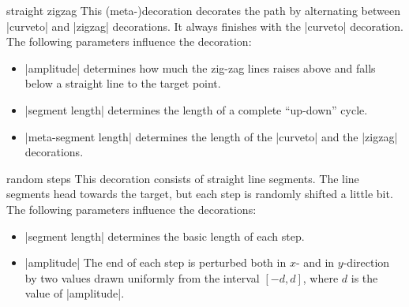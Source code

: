 \begin{decoration}{straight zigzag}
  This (meta-)decoration decorates the path by alternating between 
  |curveto| and |zigzag| decorations. It always finishes
  with the |curveto| decoration. The following parameters influence
  the decoration:
  \begin{itemize}
  \item |amplitude|
    determines how much the zig-zag lines raises above and falls below
    a straight line to the target point.
  \item |segment length|
    determines the length of a complete ``up-down'' cycle.
  \item	|meta-segment length|
    determines the length of the |curveto| and the |zigzag| decorations.
  \end{itemize}

\begin{codeexample}[]
\end{codeexample}
\end{decoration}


\begin{decoration}{random steps}
  This decoration consists of straight line segments. The line segments
  head towards the target, but each step is randomly shifted a little
  bit. The following parameters influence the decorations:
  \begin{itemize}
  \item |segment length|
    determines the basic length of each step.
  \item |amplitude|
    The end of each step is perturbed both in $x$- and in
    $y$-direction by two values drawn uniformly from the interval
    $[-d,d]$, where $d$ is the value of |amplitude|.
  \end{itemize}
\begin{codeexample}[]
\end{codeexample}
\end{decoration}


